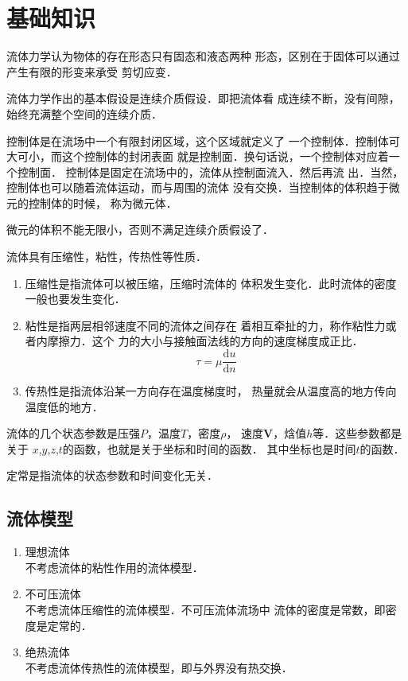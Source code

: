 
\chapter{基础知识}
流体力学认为物体的存在形态只有固态和液态两种
形态，区别在于固体可以通过产生有限的形变来承受
剪切应变．

流体力学作出的基本假设是连续介质假设．即把流体看
成连续不断，没有间隙，始终充满整个空间的连续介质．

控制体是在流场中一个有限封闭区域，这个区域就定义了
一个控制体．控制体可大可小，而这个控制体的封闭表面
就是控制面．换句话说，一个控制体对应着一个控制面．
控制体是固定在流场中的，流体从控制面流入．然后再流
出．当然，控制体也可以随着流体运动，而与周围的流体
没有交换．当控制体的体积趋于微元的控制体的时候，
称为微元体．
\begin{notice}
	微元的体积不能无限小，否则不满足连续介质假设了．
\end{notice}

流体具有压缩性，粘性，传热性等性质．
\begin{enumerate}
	\item 压缩性是指流体可以被压缩，压缩时流体的
	      体积发生变化．此时流体的密度一般也要发生变化．
	\item 粘性是指两层相邻速度不同的流体之间存在
	      着相互牵扯的力，称作粘性力或者内摩擦力．这个
	      力的大小与接触面法线的方向的速度梯度成正比．
	      \[
		      \tau=\mu \frac{\mathrm{d}u}{\mathrm{d}n}
	      \]
	\item 传热性是指流体沿某一方向存在温度梯度时，
	      热量就会从温度高的地方传向温度低的地方．
\end{enumerate}

流体的几个状态参数是压强$P$，温度$T$，密度$\rho$，
速度$\mathbf{V}$，焓值$h$等．这些参数都是关于
$x$,$y$,$z$,$t$的函数，也就是关于坐标和时间的函数．
其中坐标也是时间$t$的函数．

定常是指流体的状态参数和时间变化无关．

\section{流体模型}
\begin{enumerate}
	\item 理想流体 \\
	      不考虑流体的粘性作用的流体模型．
	\item 不可压流体 \\
	      不考虑流体压缩性的流体模型．不可压流体流场中
	      流体的密度是常数，即密度是定常的．
	\item 绝热流体 \\
	      不考虑流体传热性的流体模型，即与外界没有热交换．
\end{enumerate}

